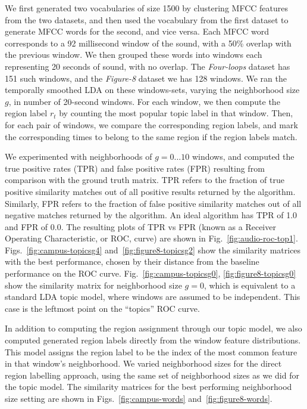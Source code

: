 We first generated two vocabularies of size 1500 by clustering MFCC features from the two datasets, and then used the vocabulary from the first dataset to generate MFCC words for the second, and vice versa. Each MFCC word corresponds to a 92 millisecond window of the sound, with a 50\% overlap with the previous window. We then grouped these words into windows each representing 20 seconds of sound, with no overlap. The \emph{Four-loops} dataset  has 151 such windows, and the \emph{Figure-8} dataset we has 128 windows. We ran the temporally smoothed LDA on these windows-sets, varying the neighborhood size $g$, in number of 20-second windows. For each window, we then compute the region label $r_t$ by counting the most popular topic label in that window. Then, for each pair of windows, we compare the corresponding region labels, and mark the corresponding times to belong to the same region if the region labels match. 

We experimented with neighborhoods of $g=0 \ldots 10$ windows, and computed the true positive rates (TPR) and false positive rates (FPR) resulting from comparison with the ground truth matrix. TPR refers to the fraction of true positive similarity matches out of all positive results returned by the algorithm. Similarly, FPR refers to the fraction of false positive similarity matches out of all negative matches returned by the algorithm. An ideal algorithm has TPR of 1.0 and FPR of 0.0. The resulting plots of TPR vs FPR (known as a Receiver Operating Characteristic, or ROC, curve) are shown in Fig.~\ref{fig:audio-roc-top1}. Figs.~\ref{fig:campus-topicsg4} and~\ref{fig:figure8-topicsg2} show the similarity matrices with the best performance, chosen by their distance from the baseline performance on the ROC curve.  Fig.~\ref{fig:campus-topicsg0}, \ref{fig:figure8-topicsg0} show the similarity matrix for neighborhood size $g=0$, which is equivalent to a standard LDA topic model, where windows are assumed to be independent. This case is the leftmost point on the ``topics'' ROC curve. 

In addition to computing the region assignment through our topic model, we also computed generated region labels directly from the window feature distributions. This model assigns the region label to be the index of the most common feature in that window's neighborhood. We varied neighborhood sizes for the direct region labelling approach, using the same set of neighborhood sizes as we did for the topic model. The similarity matrices for the best performing neighborhood size setting are shown in Figs.~\ref{fig:campus-words} and~\ref{fig:figure8-words}.

